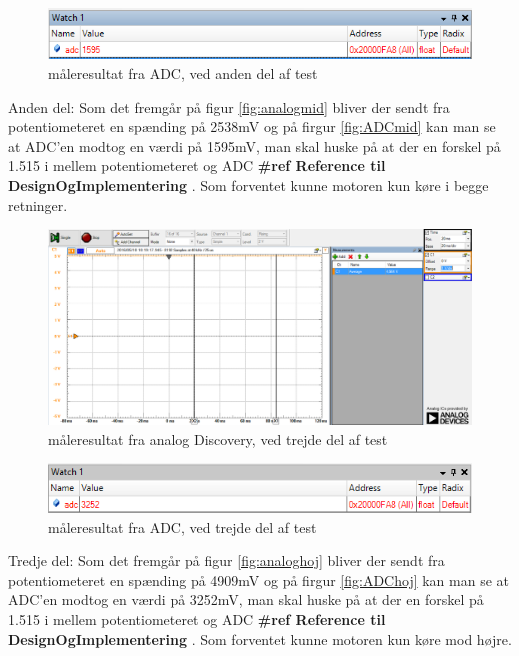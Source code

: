 \begin{figure}[H]
	\centering
	\includegraphics[width=\textwidth]{test/images/ModultestADC/mellemDebug}
	\caption{måleresultat fra ADC, ved anden del af test}
	\label{figure: ADCmid}
\end{figure}
Anden del: Som det fremgår på figur \ref{fig:analogmid}  bliver der sendt fra potentiometeret en spænding på 2538mV og på firgur \ref{fig:ADCmid}  kan man se at ADC’en modtog en værdi på 1595mV, man skal huske på at der en forskel på 1.515 i mellem potentiometeret og ADC \textbf{\#ref Reference til DesignOgImplementering }. 
Som forventet kunne motoren kun køre i begge retninger.\\


\begin{figure}[H]
	\centering
	\includegraphics[width=\textwidth]{test/images/ModultestADC/4904mVanalog}
	\caption{måleresultat fra analog Discovery, ved trejde del af test}
	\label{figure:analoghoj}
\end{figure}
\begin{figure}[H]
	\centering
	\includegraphics[width=\textwidth]{test/images/ModultestADC/opDebug}
	\caption{måleresultat fra ADC, ved trejde del af test}
	\label{figure: ADChoj}
\end{figure}
Tredje del: Som det fremgår på figur \ref{fig:analoghoj} bliver der sendt fra potentiometeret en spænding på 4909mV og på firgur \ref{fig:ADChoj}  kan man se at ADC’en modtog en værdi på 3252mV, man skal huske på at der en forskel på 1.515 i mellem potentiometeret og ADC \textbf{\#ref Reference til DesignOgImplementering }. 
Som forventet kunne motoren kun køre mod højre.


